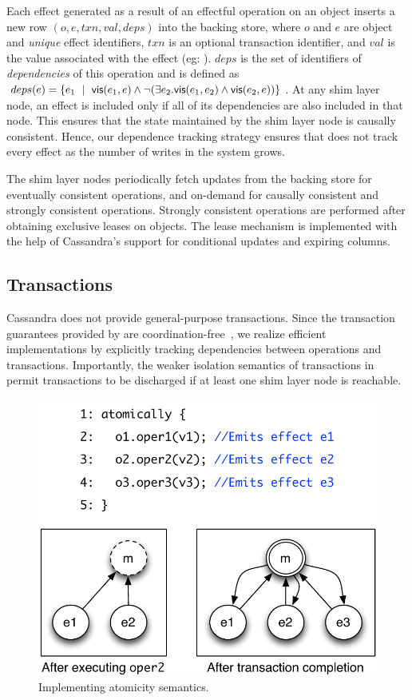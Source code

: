 Each effect generated as a result of an effectful operation on an object
inserts a new row $(o,\allowbreak e,\allowbreak txn,\allowbreak val,
\allowbreak deps)$ into the backing store, where $o$ and $e$ are object and
\emph{unique} effect identifiers, $txn$ is an optional transaction identifier,
and $val$ is the value associated with the effect (eg: ).
$deps$ is the set of identifiers of \emph{dependencies} of this operation and
is defined as $deps(e) = \{e_1 ~\mid~ {\normalfont \textsf{vis}(e_1,e)} \wedge \neg(\exists
e_2.{\normalfont \textsf{vis}(e_1,e_2)} \wedge {\normalfont \textsf{vis}(e_2,e)})\}$. At any shim layer node, an effect
is included only if all of its dependencies are also included in that node.
This ensures that the state maintained by the shim layer node is causally
consistent. Hence, our dependence tracking strategy ensures that \name does not
track every effect as the number of writes in the system grows.

The shim layer nodes periodically fetch updates from the backing store for
eventually consistent operations, and on-demand for causally consistent and
strongly consistent operations. Strongly consistent operations are performed
after obtaining exclusive leases on objects. The lease mechanism is implemented
with the help of Cassandra's support for conditional updates and expiring
columns.

\subsection{Transactions}

Cassandra does not provide general-purpose transactions. Since the transaction
guarantees provided by \name are coordination-free~\cite{BailisHAT}, we realize
efficient implementations by explicitly tracking dependencies between
operations and transactions. Importantly, the weaker isolation semantics of
transactions in \name permit transactions to be discharged if at least one shim
layer node is reachable.

\begin{figure}
\begin{center}
\includegraphics[width=0.8\columnwidth]{Figures/AtomicityImpl}
\end{center}
\caption{Implementing atomicity semantics.}
\label{fig:atomicity_impl}
\end{figure}


